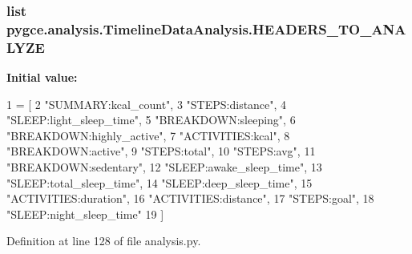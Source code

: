 \subsubsection[{\texorpdfstring{H\+E\+A\+D\+E\+R\+S\+\_\+\+T\+O\+\_\+\+A\+N\+A\+L\+Y\+ZE}{HEADERS_TO_ANALYZE}}]{\setlength{\rightskip}{0pt plus 5cm}list pygce.\+analysis.\+Timeline\+Data\+Analysis.\+H\+E\+A\+D\+E\+R\+S\+\_\+\+T\+O\+\_\+\+A\+N\+A\+L\+Y\+ZE\hspace{0.3cm}{\ttfamily [static]}}\hypertarget{classpygce_1_1analysis_1_1_timeline_data_analysis_a63947b48b5b29edd62e4ffd85933f56d}{}\label{classpygce_1_1analysis_1_1_timeline_data_analysis_a63947b48b5b29edd62e4ffd85933f56d}
{\bfseries Initial value\+:}
\begin{DoxyCode}
1 = [
2         \textcolor{stringliteral}{"SUMMARY:kcal\_count"},
3         \textcolor{stringliteral}{"STEPS:distance"},
4         \textcolor{stringliteral}{"SLEEP:light\_sleep\_time"},
5         \textcolor{stringliteral}{"BREAKDOWN:sleeping"},
6         \textcolor{stringliteral}{"BREAKDOWN:highly\_active"},
7         \textcolor{stringliteral}{"ACTIVITIES:kcal"},
8         \textcolor{stringliteral}{"BREAKDOWN:active"},
9         \textcolor{stringliteral}{"STEPS:total"},
10         \textcolor{stringliteral}{"STEPS:avg"},
11         \textcolor{stringliteral}{"BREAKDOWN:sedentary"},
12         \textcolor{stringliteral}{"SLEEP:awake\_sleep\_time"},
13         \textcolor{stringliteral}{"SLEEP:total\_sleep\_time"},
14         \textcolor{stringliteral}{"SLEEP:deep\_sleep\_time"},
15         \textcolor{stringliteral}{"ACTIVITIES:duration"},
16         \textcolor{stringliteral}{"ACTIVITIES:distance"},
17         \textcolor{stringliteral}{"STEPS:goal"},
18         \textcolor{stringliteral}{"SLEEP:night\_sleep\_time"}
19     ]
\end{DoxyCode}


Definition at line 128 of file analysis.\+py.

